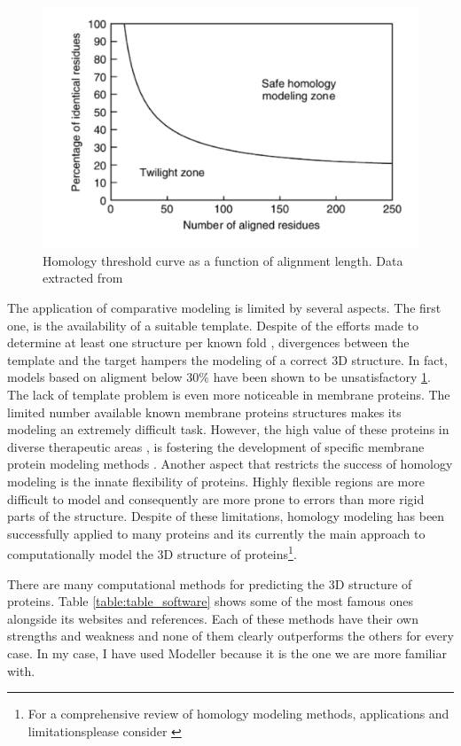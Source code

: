 \documentclass[12pt, a4paper,twoside]{tesi_upf}
\begin{document}
\begin{figure}[h]

  \centering
  	\includegraphics[scale=0.35]{../figures/homology_plot.pdf} %

	\caption{Homology threshold curve as a function of alignment length. Data extracted from \cite{Sander1991}}
	\label{fig:homology_modeling}
\end{figure}
\par The application of comparative modeling is limited by several aspects. The first one, is the availability of a suitable template. Despite of the efforts made to determine at least one structure per known fold \cite{Norvell2007}, divergences between the template and the target hampers the modeling of a correct 3D structure. In fact, models based on aligment below 30$\%$ have been shown to be unsatisfactory \ref{fig:homology_modeling}. The lack of template problem is even more noticeable in membrane proteins. The limited number available known membrane proteins structures makes its modeling an extremely difficult task. However, the high value of these proteins in diverse therapeutic areas \cite{Du2012, Kampen2011}, is fostering the development of specific membrane protein modeling methods \cite{Leman2015}. Another aspect that restricts the success of homology modeling is the innate flexibility of proteins. Highly flexible regions are more difficult to model and consequently are more prone to errors than more rigid parts of the structure. Despite of these limitations, homology modeling has been successfully applied to many proteins and its currently the main approach to computationally model the 3D structure of proteins\footnote{For a comprehensive review of homology modeling methods, applications and limitationsplease consider \cite{Marti-Renom2000, Malmstrom2010}}. 
\par There are many computational methods for predicting the 3D structure of proteins. Table \ref{table:table_software} shows some of the most famous ones alongside its websites and references. Each of these methods have their own strengths and weakness and none of them clearly outperforms the others for every case. In my case,  I have used Modeller because it is the one we are more familiar with. 
 
\end{document}
